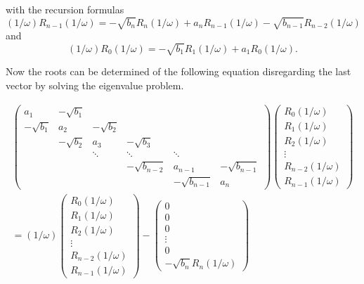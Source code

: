 with the recursion formulas
\begin{equation}
  (1/\omega)R_{n-1}(1/\omega) = - \sqrt{b_n}R_n(1/\omega) + a_nR_{n-1}(1/\omega)
                                - \sqrt{b_{n-1}} R_{n-2}(1/\omega)
\end{equation}
and
\begin{equation}
  (1/\omega)R_0(1/\omega) = - \sqrt{b_1}R_1(1/\omega) + a_1 R_0(1/\omega) .
\end{equation}

Now the roots can be determined of the following equation disregarding the
last vector by solving the eigenvalue problem.

\begin{equation}
 \begin{split}
 \begin{pmatrix}
a_1        & -\sqrt{b_1}&            &                &             &          \\
-\sqrt{b_1}& a_2        & -\sqrt{b_2}&                &             &          \\
           & -\sqrt{b_2}& a_3        & -\sqrt{b_3}    &             &          \\
           &            & \ddots     & \ddots         & \ddots      &          \\
           &            &            & -\sqrt{b_{n-2}}& a_{n-1}     & -\sqrt{b_{n-1}}\\
           &            &            &                & -\sqrt{b_{n-1}}& a_n   
 \end{pmatrix}
 \begin{pmatrix}
  R_0(1/\omega)\\
  R_1(1/\omega)\\
  R_2(1/\omega)\\
  \vdots\\
  R_{n-2}(1/\omega)\\
  R_{n-1}(1/\omega)
 \end{pmatrix}         \\
 = (1/\omega)
 \begin{pmatrix}
  R_0(1/\omega)\\
  R_1(1/\omega)\\
  R_2(1/\omega)\\
  \vdots\\
  R_{n-2}(1/\omega)\\
  R_{n-1}(1/\omega)
 \end{pmatrix}
 -
 \begin{pmatrix}
  0\\
  0\\
  0\\
  \vdots\\
  0\\
  -\sqrt{b_n} R_{n}(1/\omega)
 \end{pmatrix}
 \end{split}
\end{equation}

